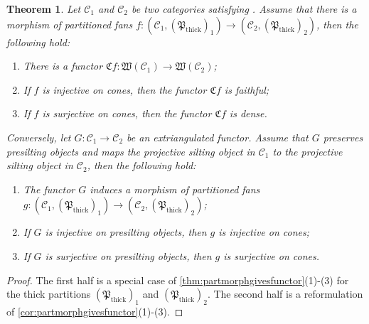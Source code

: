 \documentclass[10pt,twoside, a4paper,reqno]{amsart}
\DeclareMathOperator{\thick}{thick}
\newcommand{\Wfrak}{\mathfrak{W}}
\newcommand{\Pfrak}{\mathfrak{P}}
\newcommand{\calC}{\mathcal{C}}
\newtheorem{theorem}{Theorem}[section]
\theoremstyle{definition}
\begin{document}
\begin{theorem}\label{thm:introthm2}
    Let $\calC_1$ and $\calC_2$ be two categories satisfying . Assume that there is a morphism of partitioned fans $f: (\calC_1, (\Pfrak_{\thick})_1) \to (\calC_2, (\Pfrak_{\thick})_2)$, then the following hold: 
    \begin{enumerate}
        \item There is a functor $\mathfrak{C} f: \Wfrak(\calC_1) \to \Wfrak(\calC_2)$;
        \item If $f$ is injective on cones, then the functor $\mathfrak{C} f$ is faithful;
        \item If $f$ is surjective on cones, then the functor $\mathfrak{C} f$ is dense.
    \end{enumerate}
    Conversely, let $G: \calC_1 \to \calC_2$ be an extriangulated functor. Assume that $G$ preserves presilting objects and maps the projective silting object in $\calC_1$ to the projective silting object in $\calC_2$, then the following hold:
    \begin{enumerate}
        \item[(4)] The functor $G$ induces a morphism of partitioned fans $g: (\calC_1, (\Pfrak_{\thick})_1) \to (\calC_2, (\Pfrak_{\thick})_2)$;
        \item[(5)] If $G$ is injective on presilting objects, then $g$ is injective on cones;
        \item[(6)] If $G$ is surjective on presilting objects, then $g$ is surjective on cones.
    \end{enumerate}
\end{theorem}
\begin{proof}
    The first half is a special case of \cref{thm:partmorphgivesfunctor}(1)-(3) for the thick partitions $(\Pfrak_{\thick})_1$ and $(\Pfrak_{\thick})_2$. The second half is a reformulation of \cref{cor:partmorphgivesfunctor}(1)-(3).
\end{proof}
\end{document}
